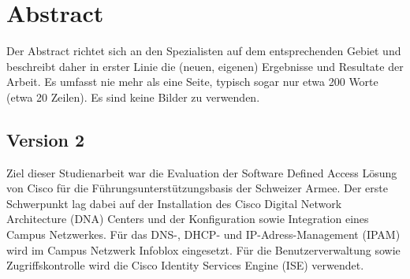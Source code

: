 \section{Abstract}
Der Abstract richtet sich an den Spezialisten auf dem entsprechenden Gebiet und 
beschreibt daher in erster Linie die (neuen, eigenen) Ergebnisse und Resultate der 
Arbeit. Es umfasst nie mehr als eine Seite, typisch sogar nur etwa 200 Worte (etwa 
20 Zeilen). Es sind keine Bilder zu verwenden.

\subsection{Version 2}

Ziel dieser Studienarbeit war die Evaluation der Software Defined Access Lösung von Cisco für die Führungsunterstützungsbasis der Schweizer Armee. Der erste Schwerpunkt lag dabei auf der Installation des Cisco Digital Network Architecture (DNA) Centers und der Konfiguration sowie Integration eines Campus Netzwerkes. Für das DNS-, DHCP- und IP-Adress-Management (IPAM) wird im Campus Netzwerk Infoblox eingesetzt. Für die Benutzerverwaltung sowie Zugriffskontrolle wird die Cisco Identity Services Engine (ISE) verwendet.

